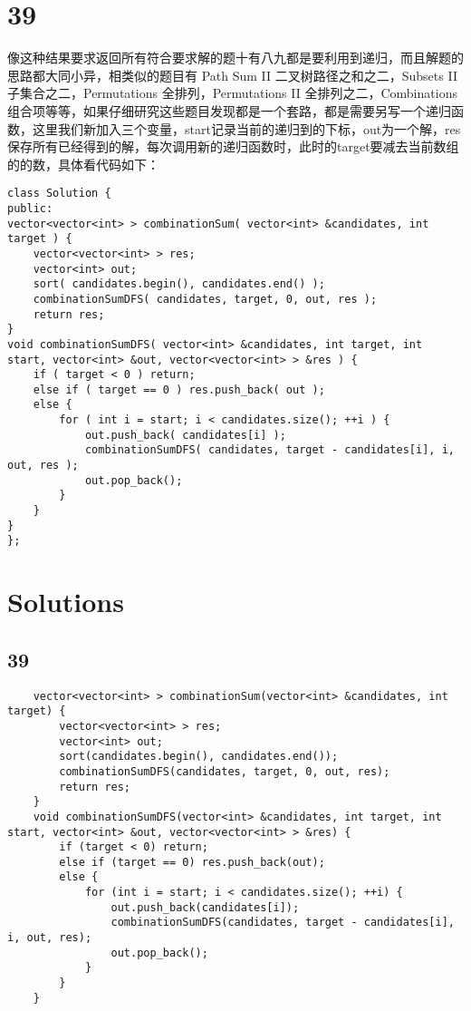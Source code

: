 \documentclass[12pt,a4paper]{article}
\begin{document}
\section{39}
\begin{CJK}{UTF8}{gbsn}
像这种结果要求返回所有符合要求解的题十有八九都是要利用到递归，而且解题的思路都大同小异，相类似的题目有 Path Sum II 二叉树路径之和之二，Subsets II 子集合之二，Permutations 全排列，Permutations II 全排列之二，Combinations 组合项等等，如果仔细研究这些题目发现都是一个套路，都是需要另写一个递归函数，这里我们新加入三个变量，start记录当前的递归到的下标，out为一个解，res保存所有已经得到的解，每次调用新的递归函数时，此时的target要减去当前数组的的数，具体看代码如下：
\end{CJK}
\begin{lstlisting}
class Solution {
public:
vector<vector<int> > combinationSum( vector<int> &candidates, int target ) {
	vector<vector<int> > res;
	vector<int> out;
	sort( candidates.begin(), candidates.end() );
	combinationSumDFS( candidates, target, 0, out, res );
	return res;
}
void combinationSumDFS( vector<int> &candidates, int target, int start, vector<int> &out, vector<vector<int> > &res ) {
	if ( target < 0 ) return;
	else if ( target == 0 ) res.push_back( out );
	else {
		for ( int i = start; i < candidates.size(); ++i ) {
			out.push_back( candidates[i] );
			combinationSumDFS( candidates, target - candidates[i], i, out, res );
			out.pop_back();
		}
	}
}
};
\end{lstlisting}


	
	
	\section*{Solutions}
	
	\subsection*{39}
	\begin{lstlisting}
	vector<vector<int> > combinationSum(vector<int> &candidates, int target) {
        vector<vector<int> > res;
        vector<int> out;
        sort(candidates.begin(), candidates.end());
        combinationSumDFS(candidates, target, 0, out, res);
        return res;
    }
    void combinationSumDFS(vector<int> &candidates, int target, int start, vector<int> &out, vector<vector<int> > &res) {
        if (target < 0) return;
        else if (target == 0) res.push_back(out);
        else {
            for (int i = start; i < candidates.size(); ++i) {
                out.push_back(candidates[i]);
                combinationSumDFS(candidates, target - candidates[i], i, out, res);
                out.pop_back();
            }
        }
    }
	\end{lstlisting}
	
\end{document}
